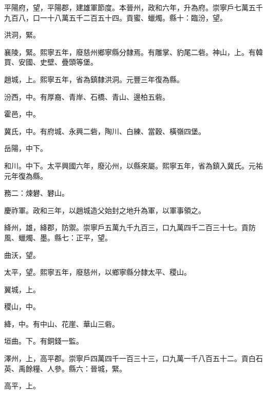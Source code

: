\begin{pinyinscope}
 平陽府，望，平陽郡，建雄軍節度。本晉州，政和六年，升為府。崇寧戶七萬五千九百八，口一十八萬五千二百五十四。貢蜜、蠟燭。縣十：臨汾，望。



 洪洞，緊。



 襄陵，緊。熙寧五年，廢慈州鄉寧縣分隸焉。有雕掌、豹尾二砦。神山，上。有韓買、安國、史壁、疊頭等堡。



 趙城，上。熙寧五年，省為鎮隸洪洞。元豐三年復為縣。



 汾西，中。有厚裔、青岸、石橋、青山、邊柏五砦。



 霍邑，中。



 冀氏，中。有府城、永興二砦，陶川、白練、當穀、橫嶺四堡。



 岳陽，中下。



 和川。中下。太平興國六年，廢沁州，以縣來屬。熙寧五年，省為鎮入冀氏。元祐元年復為縣。



 務二：煉礬、礬山。



 慶祚軍。政和三年，以趙城造父始封之地升為軍，以軍事領之。



 絳州，雄，絳郡，防禦。崇寧戶五萬九千九百三，口九萬四千二百三十七。貢防風、蠟燭、墨。縣七：正平，望。



 曲沃，望。



 太平，望。熙寧五年，廢慈州，以鄉寧縣分隸太平、稷山。



 翼城，上。



 稷山，中。



 絳，中。有中山、花崖、華山三砦。



 垣曲。下。有銅錢一監。



 澤州，上，高平郡。崇寧戶四萬四千一百三十三，口九萬一千八百五十二。貢白石英、禹餘糧、人參。縣六：晉城，緊。



 高平，上。




\end{pinyinscope}
